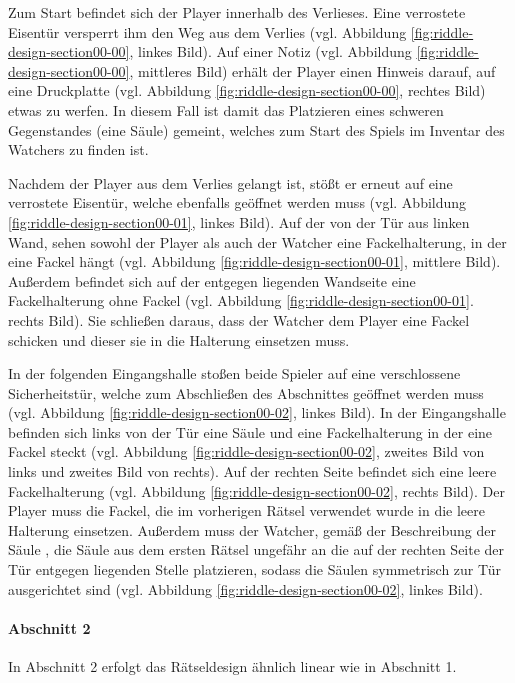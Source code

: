 Zum Start befindet sich der Player innerhalb des Verlieses. Eine verrostete Eisentür versperrt ihm den Weg aus dem Verlies (vgl. Abbildung \ref{fig:riddle-design-section00-00}, linkes Bild). Auf einer Notiz (vgl. Abbildung \ref{fig:riddle-design-section00-00}, mittleres Bild) erhält der Player einen Hinweis darauf, auf eine Druckplatte (vgl. Abbildung \ref{fig:riddle-design-section00-00}, rechtes Bild) etwas zu werfen. In diesem Fall ist damit das Platzieren eines schweren Gegenstandes (eine Säule) gemeint, welches zum Start des Spiels im Inventar des Watchers zu finden ist. 

Nachdem der Player aus dem Verlies gelangt ist, stößt er erneut auf eine verrostete Eisentür, welche ebenfalls geöffnet werden muss (vgl. Abbildung \ref{fig:riddle-design-section00-01}, linkes Bild). Auf der von der Tür aus linken Wand, sehen sowohl der Player als auch der Watcher eine Fackelhalterung, in der eine Fackel hängt (vgl. Abbildung \ref{fig:riddle-design-section00-01}, mittlere Bild). Außerdem befindet sich auf der entgegen liegenden Wandseite eine Fackelhalterung ohne Fackel (vgl. Abbildung \ref{fig:riddle-design-section00-01}. rechts Bild). Sie schließen daraus, dass der Watcher dem Player eine Fackel schicken und dieser sie in die Halterung einsetzen muss.

In der folgenden Eingangshalle stoßen beide Spieler auf eine verschlossene Sicherheitstür, welche zum Abschließen des Abschnittes geöffnet werden muss (vgl. Abbildung \ref{fig:riddle-design-section00-02}, linkes Bild). In der Eingangshalle befinden sich links von der Tür eine Säule und eine Fackelhalterung in der eine Fackel steckt (vgl. Abbildung \ref{fig:riddle-design-section00-02}, zweites Bild von links und zweites Bild von rechts). Auf der rechten Seite befindet sich eine leere Fackelhalterung (vgl. Abbildung \ref{fig:riddle-design-section00-02}, rechts Bild). Der Player muss die Fackel, die im vorherigen Rätsel verwendet wurde in die leere Halterung einsetzen. Außerdem muss der Watcher, gemäß der Beschreibung der Säule , die Säule aus dem ersten Rätsel ungefähr an die auf der rechten Seite der Tür entgegen liegenden Stelle platzieren, sodass die Säulen symmetrisch zur Tür ausgerichtet sind (vgl. Abbildung \ref{fig:riddle-design-section00-02}, linkes Bild).

\paragraph{Abschnitt 2}
In Abschnitt 2 erfolgt das Rätseldesign ähnlich linear wie in Abschnitt 1.

